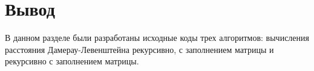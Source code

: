 \section*{Вывод}

В данном разделе были разработаны исходные коды трех алгоритмов:
вычисления расстояния Дамерау-Левенштейна рекурсивно, с заполнением матрицы и рекурсивно с заполнением матрицы.